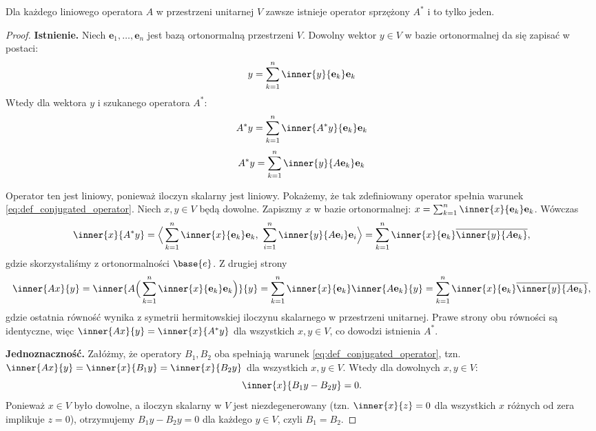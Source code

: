 \begin{theorem}
Dla każdego liniowego operatora $A$ w przestrzeni unitarnej $V$ zawsze istnieje operator sprzężony $A^*$ i to tylko jeden.
\end{theorem}
\begin{proof}
\textbf{Istnienie.} Niech $\mathbf{e}_1, \ldots, \mathbf{e}_n$ jest bazą ortonormalną przestrzeni $V$. Dowolny wektor $y \in V$ w bazie ortonormalnej da się zapisać w postaci:
$$ y = \sum_{k=1}^{n}{\inner{y}{\mathbf{e}_k}\mathbf{e}_k} $$
    Wtedy dla wektora $y$ i szukanego operatora $A^*$:
\begin{equation}
        A^*y = \sum_{k=1}^{n}{\inner{A^*y}{\mathbf{e}_k}\mathbf{e}_k}
\end{equation}
\begin{equation}
        A^*y = \sum_{k=1}^{n}{\inner{y}{A\mathbf{e}_k}\mathbf{e}_k}
\end{equation}

Operator ten jest liniowy, ponieważ iloczyn skalarny jest liniowy.
Pokażemy, że tak zdefiniowany operator spełnia warunek \eqref{eq:def_conjugated_operator}. Niech $x, y \in V$ będą dowolne. Zapiszmy $x$ w bazie ortonormalnej: $x = \sum_{k=1}^n \inner{x}{\mathbf{e}_k}\mathbf{e}_k$. Wówczas
\begin{equation}
    \inner{x}{A^*y} = \Big\langle \sum_{k=1}^n \inner{x}{\mathbf{e}_k}\mathbf{e}_k,\ \sum_{i=1}^n \inner{y}{A\mathbf{e}_i}\mathbf{e}_i \Big\rangle = \sum_{k=1}^n \inner{x}{\mathbf{e}_k}\overline{\inner{y}{A\mathbf{e}_k}},
\end{equation}
gdzie skorzystaliśmy z ortonormalności $\base{e}$. 
Z drugiej strony
\begin{equation}
    \inner{Ax}{y} = \inner{
        A\Big(\sum_{k=1}^n \inner{x}{\mathbf{e}_k}\mathbf{e}_k\Big)
    }{y} = \sum_{k=1}^n \inner{x}{\mathbf{e}_k}\inner{A\mathbf{e}_k}{y} = \sum_{k=1}^n \inner{x}{\mathbf{e}_k}\overline{\inner{y}{A\mathbf{e}_k}},
\end{equation}
gdzie ostatnia równość wynika z symetrii hermitowskiej iloczynu skalarnego w przestrzeni unitarnej.
Prawe strony obu równości są identyczne, więc $\inner{Ax}{y} = \inner{x}{A^*y}$ dla wszystkich $x,y \in V$, co dowodzi istnienia $A^*$.

\textbf{Jednoznaczność.} Załóżmy, że operatory $B_1, B_2$ oba spełniają warunek \eqref{eq:def_conjugated_operator}, tzn. $\inner{Ax}{y} = \inner{x}{B_1y} = \inner{x}{B_2y}$ dla wszystkich $x,y \in V$. Wtedy dla dowolnych $x, y \in V$:
\begin{equation}
    \inner{x}{B_1y - B_2y} = 0.
\end{equation}
Ponieważ $x \in V$ było dowolne, a iloczyn skalarny w $V$ jest niezdegenerowany (tzn. $\inner{x}{z}=0$ dla wszystkich $x$ różnych od zera implikuje $z=0$), otrzymujemy $B_1y - B_2y = 0$ dla każdego $y \in V$, czyli $B_1 = B_2$.
\end{proof}

